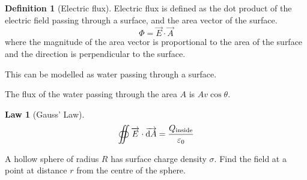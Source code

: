 \documentclass[fleqn, a4paper, 12pt, twoside]{article}
\theoremstyle{definition}
\newtheorem{definition}{Definition}
\theoremstyle{theorem}
\newtheorem{law}{Law}
\begin{document}
\begin{definition}[Electric flux]
	Electric flux is defined as the dot product of the electric field passing through a surface, and the area vector of the surface.
	\begin{equation*}
		\Phi = \overrightarrow{E} \cdot \overrightarrow{A}
	\end{equation*}
	where the magnitude of the area vector is proportional to the area of the surface and the direction is perpendicular to the surface.
\end{definition}

This can be modelled as water passing through a surface.

\begin{figure}[H]
\end{figure}

The flux of the water passing through the area $A$ is $A v \cos \theta$.

\begin{law}[Gauss' Law]
	\begin{equation*}
		\oiint \overrightarrow{E} \cdot \overrightarrow{\dif A} = \dfrac{Q_{\textnormal{inside}}}{\varepsilon_0}
	\end{equation*}
	\label{Gauss'_Law}
\end{law}

\begin{question}
	A hollow sphere of radius $R$ has surface charge density $\sigma$. Find the field at a point at distance $r$ from the centre of the sphere.
\end{question}
\end{document}

